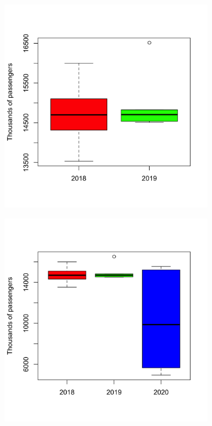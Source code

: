 \documentclass[letterpaper, 10 pt, conference]{article}
\begin{document}
\begin{figure}[h!]
	\centering
	\begin{subfigure}[b]{0.3\linewidth}
		\includegraphics[width=\linewidth]{boxplot_2018_2019.png}
		\caption{}
	\end{subfigure}
	\begin{subfigure}[b]{0.3\linewidth}
		\includegraphics[width=\linewidth]{boxplot_2018_to_2020.png}

\end{subfigure}
\end{figure}
\end{document}
